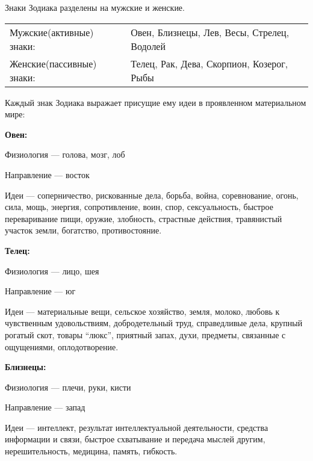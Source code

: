 Знаки Зодиака разделены на мужские и женские.

\begin{table}[tph!]
	\renewcommand{\arraystretch}{1}

	\begin{tabular}{ll}
		Мужские(активные) знаки: & Овен, Близнецы, Лев, Весы, Стрелец, Водолей \\
		Женские(пассивные) знаки: & Телец, Рак, Дева, Скорпион, Козерог, Рыбы \\
	\end{tabular}
\end{table}

Каждый знак Зодиака выражает присущие ему идеи в проявленном материальном мире:

\begin{myenum}[topsep=0]
	\item \textbf{Овен:}
		\begin{mydescr}
			\item[Физиология] --- голова, мозг, лоб
			\item[Направление] --- восток
			\item[Идеи] --- соперничество, рискованные дела, борьба, война, соревнование, огонь, сила, мощь, энергия, сопротивление, воин, спор, сексуальность, быстрое переваривание пищи, оружие, злобность, страстные действия, травянистый участок земли, богатство, противостояние.
		\end{mydescr}
	\item \textbf{Телец:}
		\begin{mydescr}
			\item[Физиология] --- лицо, шея
			\item[Направление] --- юг
			\item[Идеи] --- материальные вещи, сельское хозяйство, земля, молоко, любовь к чувственным удовольствиям, добродетельный труд, справедливые дела, крупный рогатый скот, товары ``люкс'', приятный запах, духи, предметы, связанные с ощущениями, оплодотворение.
		\end{mydescr}
	\item \textbf{Близнецы:}
		\begin{mydescr}
			\item[Физиология] --- плечи, руки, кисти
			\item[Направление] --- запад
			\item[Идеи] ---  интеллект, результат интеллектуальной деятельности, средства информации и связи, быстрое схватывание и передача мыслей другим, нерешительность, медицина, память, гибкость.

\end{mydescr}
\end{myenum}
